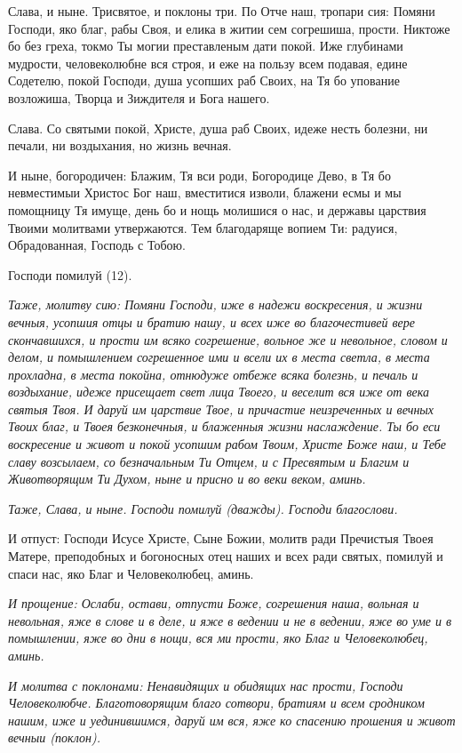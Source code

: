 Слава, и ныне. Трисвятое, и поклоны три. По Отче наш, тропари сия: Помяни Господи, яко благ, рабы Своя, и елика в житии сем согрешиша, прости. Никтоже бо без греха, токмо Ты могии преставленым дати покой. Иже глубинами мудрости, человеколюбне вся строя, и еже на пользу всем подавая, едине Содетелю, покой Господи, душа усопших раб Своих, на Тя бо упование возложиша, Творца и Зиждителя и Бога нашего. 

Слава. Со святыми покой, Христе, душа раб Своих, идеже несть болезни, ни печали, ни воздыхания, но жизнь вечная. 

И ныне, богородичен: Блажим, Тя вси роди, Богородице Дево, в Тя бо невместимыи Христос Бог наш, вместитися изволи, блажени есмы и мы помощницу Тя имуще, день бо и нощь молишися о нас, и державы царствия Твоими молитвами утвержаются. Тем благодаряще вопием Ти: радуися, Обрадованная, Господь с Тобою. 

Господи помилуй (12).


\itshape Таже, молитву сию:\normalfont{} Помяни Господи, иже в надежи воскресения, и жизни вечныя, усопшия отцы и братию нашу, и всех иже во благочестивей вере скончавшихся, и прости им всяко согрешение, вольное же и невольное, словом и делом, и помышлением согрешенное ими и всели их в места светла, в места прохладна, в места покойна, отнюдуже отбеже всяка болезнь, и печаль и воздыхание, идеже присещает свет лица Твоего, и веселит вся иже от века святыя Твоя. И даруй им царствие Твое, и причастие неизреченных и вечных Твоих благ, и Твоея безконечныя, и блаженныя жизни наслаждение. Ты бо еси воскресение и живот и покой усопшим рабом Твоим, Христе Боже наш, и Тебе славу возсылаем, со безначальным Ти Отцем, и с Пресвятым и Благим и Животворящим Ти Духом, ныне и присно и во веки веком, аминь. 

\itshape Таже, Слава, и ныне. Господи помилуй (дважды). Господи благослови. 

И отпуст:\normalfont{} Господи Исусе Христе, Сыне Божии, молитв ради Пречистыя Твоея Матере, преподобных и богоносных отец наших и всех ради святых, помилуй и спаси нас, яко Благ и Человеколюбец, аминь. 

\itshape И прощение:\normalfont{} Ослаби, остави, отпусти Боже, согрешения наша, вольная и невольная, яже в слове и в деле, и яже в ведении и не в ведении, яже во уме и в помышлении, яже во дни в нощи, вся ми прости, яко Благ и Человеколюбец, аминь.


\itshape И молитва с поклонами:\normalfont{} Ненавидящих и обидящих нас прости, Господи Человеколюбче. Благотоворящим благо сотвори, братиям и всем сродником нашим, иже и уединившимся, даруй им вся, яже ко спасению прошения и живот вечныи (поклон). 

